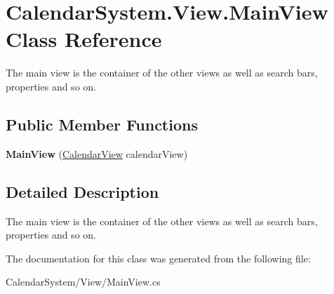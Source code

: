 \hypertarget{class_calendar_system_1_1_view_1_1_main_view}{\section{Calendar\+System.\+View.\+Main\+View Class Reference}
\label{class_calendar_system_1_1_view_1_1_main_view}
}


The main view is the container of the other views as well as search bars, properties and so on.  


\subsection*{Public Member Functions}
\begin{DoxyCompactItemize}
\item 
\hypertarget{class_calendar_system_1_1_view_1_1_main_view_aed8181268948a63772e2b864f0191849}{{\bfseries Main\+View} (\hyperlink{class_calendar_system_1_1_view_1_1_calendar_view}{Calendar\+View} calendar\+View)}\label{class_calendar_system_1_1_view_1_1_main_view_aed8181268948a63772e2b864f0191849}

\end{DoxyCompactItemize}


\subsection{Detailed Description}
The main view is the container of the other views as well as search bars, properties and so on. 



The documentation for this class was generated from the following file\+:\begin{DoxyCompactItemize}
\item 
Calendar\+System/\+View/Main\+View.\+cs\end{DoxyCompactItemize}

